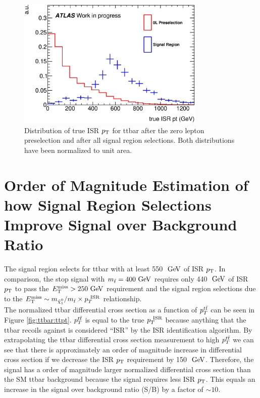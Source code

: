 \begin{figure}[h!]
  \centering
	\includegraphics[width=0.80\textwidth]{./figures/strategy/Compare0L_truth.eps}
\caption[Distribution of true ISR $\pt$ for ttbar after the zero lepton preselection and after all signal region selections]{Distribution of true ISR $\pt$ for ttbar after the zero lepton preselection and after all signal region selections.  Both distributions have been normalized to unit area.}
\label{fig:ttbar:SR:trueISRpt_presel_SRC}
\end{figure}

\section{Order of Magnitude Estimation of how Signal Region Selections Improve Signal over Background Ratio}
\label{sec:SR:estimate}

\indent The signal region selects for ttbar with at least 550 $\gev$ of ISR $\pt$.  In comparison, the stop signal with $m_{\stop} = 400 \gev$ requires only 440 $\gev$ of ISR $\pt$ to pass the $\met > 250 \gev$ requirement and the signal region selections due to the $\met \sim m_{\ninoone}/m_{\stop} \times \PTISR $ relationship.  \\

\indent The normalized ttbar differential cross section as a function of $p_{T}^{t\bar{t}}$ can be seen in Figure \ref{fig:ttbar:ttpt}.  $p_T^{t\bar{t}}$ is equal to the true $p_{T}^{~\mathrm{ISR}}$ because anything that the ttbar recoils against is considered ``ISR'' by the ISR identification algorithm.  By extrapolating the ttbar differential cross section measurement to high $p_T^{t\bar{t}}$ we can see that there is approximately an order of magnitude increase in differential cross section if we decrease the ISR $\pt$ requirement by 150 $\gev$.  Therefore, the signal has a order of magnitude larger normalized differential cross section than the SM ttbar background because the signal requires less ISR $\pt$.   This equals an increase in the signal over background ratio (S/B) by a factor of $\sim10$. \\

